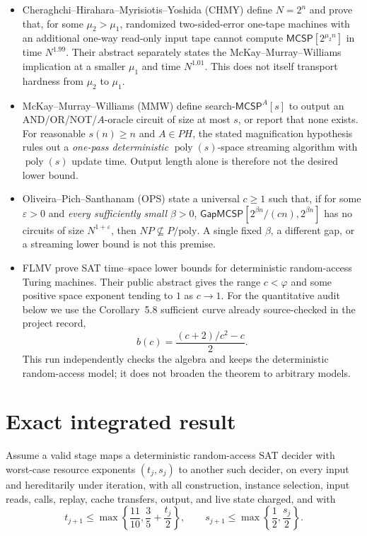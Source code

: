 \documentclass[11pt]{article}
\newcommand{\MCSP}{\mathsf{MCSP}}
\newcommand{\GapMCSP}{\mathsf{GapMCSP}}
\begin{document}
\begin{itemize}[leftmargin=*]
  \item Cheraghchi--Hirahara--Myrisiotis--Yoshida (CHMY) define
  $N=2^n$ and prove that, for some $\mu_2>\mu_1$, randomized two-sided-error
  one-tape machines with an additional one-way read-only input tape cannot
  compute $\MCSP[2^{\mu_2 n}]$ in time $N^{1.99}$.  Their abstract separately
  states the McKay--Murray--Williams implication at a smaller $\mu_1$ and time
  $N^{1.01}$.  This does not itself transport hardness from $\mu_2$ to $\mu_1$.
  \item McKay--Murray--Williams (MMW) define search-$\MCSP^A[s]$ to output an
  AND/OR/NOT/$A$-oracle circuit of size at most $s$, or report that none exists.
  For reasonable $s(n)\ge n$ and $A\in PH$, the stated magnification hypothesis
  rules out a \emph{one-pass deterministic} $\operatorname{poly}(s)$-space
  streaming algorithm with $\operatorname{poly}(s)$ update time.  Output length
  alone is therefore not the desired lower bound.
  \item Oliveira--Pich--Santhanam (OPS) state a universal $c\ge1$ such that, if
  for some $\varepsilon>0$ and \emph{every sufficiently small} $\beta>0$,
  $\GapMCSP[2^{\beta n}/(cn),2^{\beta n}]$ has no circuits of size
  $N^{1+\varepsilon}$, then $NP\nsubseteq P/\mathrm{poly}$.  A single fixed
  $\beta$, a different gap, or a streaming lower bound is not this premise.
  \item FLMV prove SAT time--space lower bounds for deterministic random-access
  Turing machines.  Their public abstract gives the range $c<\varphi$ and some
  positive space exponent tending to $1$ as $c\to1$.  For the quantitative
  audit below we use the Corollary~5.8 sufficient curve already source-checked
  in the project record,
  \[
     b(c)=\frac{(c+2)/c^2-c}{2}.
  \]
  This run independently checks the algebra and keeps the deterministic
  random-access model; it does not broaden the theorem to arbitrary models.
\end{itemize}

\section{Exact integrated result}

Assume a valid stage maps a deterministic random-access SAT decider with
worst-case resource exponents $(t_j,s_j)$ to another such decider, on every
input and hereditarily under iteration, with all construction, instance
selection, input reads, calls, replay, cache transfers, output, and live state
charged, and with
\begin{equation}
 t_{j+1}\le\max\left\{\frac{11}{10},\frac35+\frac{t_j}{2}\right\},
 \qquad
 s_{j+1}\le\max\left\{\frac12,\frac{s_j}{2}\right\}.
 \tag{R}
\end{equation}
\end{document}
